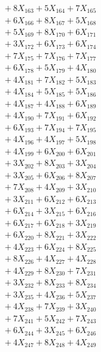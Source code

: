 \documentclass[a4paper,10pt]{article}
\begin{document}
{\begin{align}
&\;  + 8 X_{163} + 5 X_{164} + 7 X_{165} \\[0.3ex]
&\;  + 6 X_{166} + 8 X_{167} + 5 X_{168} \\[0.3ex]
&\;  + 5 X_{169} + 8 X_{170} + 6 X_{171} \\[0.3ex]
&\;  + 3 X_{172} + 6 X_{173} + 6 X_{174} \\[0.3ex]
&\;  + 7 X_{175} + 7 X_{176} + 7 X_{177} \\[0.3ex]
&\;  + 6 X_{178} + 5 X_{179} + 4 X_{180} \\[0.3ex]
&\;  + 4 X_{181} + 7 X_{182} + 5 X_{183} \\[0.3ex]
&\;  + 4 X_{184} + 5 X_{185} + 5 X_{186} \\[0.3ex]
&\;  + 4 X_{187} + 4 X_{188} + 6 X_{189} \\[0.5ex]\allowbreak
&\;  + 4 X_{190} + 7 X_{191} + 6 X_{192} \\[0.3ex]
&\;  + 6 X_{193} + 7 X_{194} + 7 X_{195} \\[0.3ex]
&\;  + 4 X_{196} + 4 X_{197} + 5 X_{198} \\[0.3ex]
&\;  + 4 X_{199} + 6 X_{200} + 6 X_{201} \\[0.3ex]
&\;  + 3 X_{202} + 8 X_{203} + 3 X_{204} \\[0.3ex]
&\;  + 3 X_{205} + 6 X_{206} + 8 X_{207} \\[0.3ex]
&\;  + 7 X_{208} + 4 X_{209} + 3 X_{210} \\[0.3ex]
&\;  + 3 X_{211} + 6 X_{212} + 6 X_{213} \\[0.3ex]
&\;  + 6 X_{214} + 3 X_{215} + 6 X_{216} \\[0.3ex]
&\;  + 6 X_{217} + 6 X_{218} + 3 X_{219} \\[0.5ex]\allowbreak
&\;  + 6 X_{220} + 8 X_{221} + 3 X_{222} \\[0.3ex]
&\;  + 4 X_{223} + 6 X_{224} + 8 X_{225} \\[0.3ex]
&\;  + 8 X_{226} + 4 X_{227} + 4 X_{228} \\[0.3ex]
&\;  + 4 X_{229} + 8 X_{230} + 7 X_{231} \\[0.3ex]
&\;  + 3 X_{232} + 8 X_{233} + 8 X_{234} \\[0.3ex]
&\;  + 3 X_{235} + 4 X_{236} + 5 X_{237} \\[0.3ex]
&\;  + 4 X_{238} + 7 X_{239} + 3 X_{240} \\[0.3ex]
&\;  + 7 X_{241} + 5 X_{242} + 7 X_{243} \\[0.3ex]
&\;  + 6 X_{244} + 3 X_{245} + 6 X_{246} \\[0.3ex]
&\;  + 4 X_{247} + 8 X_{248} + 4 X_{249} \\[0.5ex]\allowbreak

\end{align}}
\end{document}
